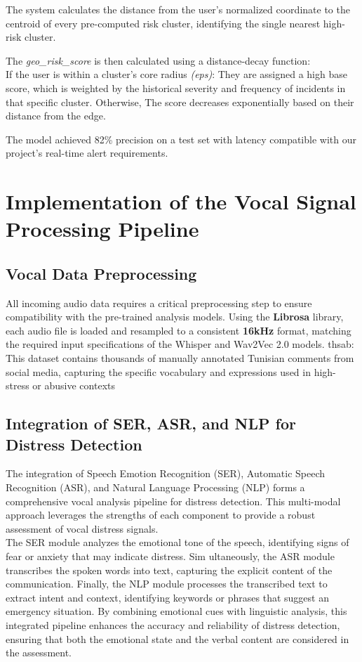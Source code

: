 \documentclass[12pt,a4paper,oneside,english]{book}
\begin{document}
{The system calculates the distance from the user's normalized coordinate to the centroid of every pre-computed risk cluster, identifying the single nearest high-risk cluster.

The \textit{geo\_risk\_score} is then calculated using a distance-decay function:
\\If the user is within a cluster's core radius \textit{(eps)}: They are assigned a high base score, which is weighted by the historical severity and frequency of incidents in that specific cluster. Otherwise, The  score decreases exponentially based on their distance from the edge.

The model achieved 82\% precision on a test set with latency compatible with our project's real-time alert requirements.

\section{Implementation of the Vocal Signal Processing Pipeline}
\subsection{Vocal Data Preprocessing}
All incoming audio data requires a critical preprocessing step to ensure compatibility with the pre-trained analysis models. Using the \textbf{Librosa} library, each audio file is loaded and resampled to a consistent \textbf{16kHz} format, matching the required input specifications of the Whisper and Wav2Vec 2.0 models.
 thsab: This dataset contains thousands of manually annotated Tunisian comments from social media, capturing the specific vocabulary 
and expressions used in high-stress or abusive contexts

\subsection{Integration of SER, ASR, and NLP for Distress Detection}%
\label{integration_ser_asr_nlp}
The integration of Speech Emotion Recognition (SER), Automatic Speech Recognition (ASR), and Natural Language Processing (NLP) forms a comprehensive vocal analysis pipeline for distress detection.
This multi-modal approach leverages the strengths of each component to provide a robust assessment of vocal distress signals.
\\The SER module analyzes the emotional tone of the speech, identifying signs of fear or anxiety that may indicate distress.
Sim ultaneously, the ASR module transcribes the spoken words into text, capturing the explicit content of the communication.
Finally, the NLP module processes the transcribed text to extract intent and context, identifying keywords or phrases that suggest an emergency situation.
By combining emotional cues with linguistic analysis, this integrated pipeline enhances the accuracy and reliability of distress detection, ensuring that both the emotional state and the verbal content are considered in the assessment.



}
\end{document}
